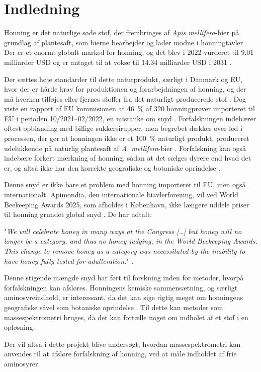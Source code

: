 \chapter{Indledning}
Honning er det naturlige søde stof, der frembringes af \textit{Apis mellifera}-bier på grundlag af plantesaft, som bierne bearbejder og lader modne i honningtavler \parencite{honningbekDA}.
Der er et enormt globalt marked for honning, og det blev i 2022 vurderet til \num{9.01} milliarder USD og er antaget til at vokse til \num{14.34} milliarder USD i 2031 \parencite{honeyMarket}.
\par Der sættes høje standarder til dette naturprodukt, særligt i Danmark og EU, hvor der er hårde krav for produktionen og forarbejdningen af honning, og der må hverken tilføjes eller fjernes stoffer fra det naturligt producerede stof \parencite{honningbekDA,honningbekEU}.
Dog viste en rapport af EU kommisionen at \qty{46}{\percent} af \num{320} honningprøver importeret til EU i perioden 10/2021--02/2022, en mistanke om snyd \parencite{EUhoney}.
Forfalskningen indebærer oftest opblanding med billige sukkersirupper, men begrebet dækker over led i processen, der gør at honningen ikke er et \qty{100}{\percent} naturligt produkt, produceret udelukkende på naturlig plantesaft af \textit{A. mellifera}-bier \parencite{adulterationhoney}.
Forfalskning kan også indebære forkert mærkning af honning, sådan at det sælges dyrere end hvad det er, og altså ikke har den korrekte geografiske og botaniske oprindelse \parencite{geohoney}.
\par Denne snyd er ikke bare et problem med honning importeret til EU, men også internationalt. Apimondia, den internationale biavlerforening, vil ved World Beekeeping Awards 2025, som afholdes i København, ikke længere uddele priser til honning grundet global snyd \parencite{awardFraud}.
De har udtalt:
\par "\textit{We will celebrate honey in many ways at the Congress [\dots] but honey will no longer be a category, and thus no honey judging, in the World Beekeeping Awards. This change to remove honey as a category was necessitated by the inability to have honey fully tested for adulteration.}" \parencite{apimondia}.
\par Denne stigende mængde snyd har ført til forskning inden for metoder, hvorpå forfalskningen kan afsløres.
Honningens kemiske sammensætning, og særligt aminosyreindhold, er interessant, da det kan sige rigtig meget om honningens geografiske såvel som botaniske oprindelse \parencite{geohoney}.
Til dette kan metoder som massespektrometri bruges, da det kan fortælle noget om indholet af et stof i en opløsning.
\par Der vil altså i dette projekt blive undersøgt, hvordan massespektrometri kan anvendes til at afsløre forfalskning af honning, ved at måle indholdet af frie aminosyrer.
